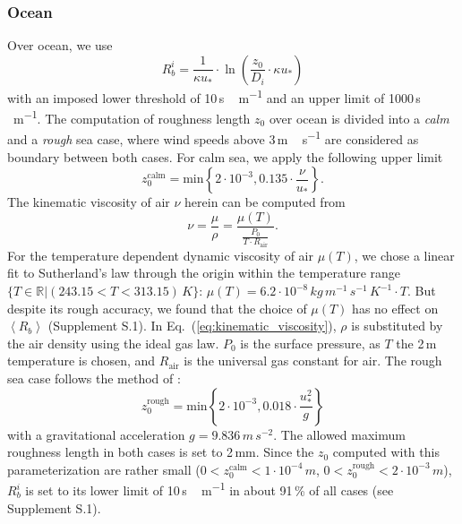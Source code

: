 \documentclass[gmd, manuscript]{copernicus}
\begin{document}
\subsubsection*{Ocean}
Over ocean, we use \citep[Eq.~(54),][]{ACP:Simpson2012}
\begin{equation}
  R_b^i = \frac{1}{\kappa u_*}\cdot\ln\left({\frac{z_0}{D_i}\cdot \kappa u_*}\right)
\end{equation}
with an imposed lower threshold of 10\,\unit{s\,m^{-1}} and an upper limit of 1000\,\unit{s\,m^{-1}}. The computation of roughness length $z_0$ over ocean is divided into a \emph{calm} and a \emph{rough} sea case, where wind speeds above 3\,\unit{m\,s^{-1}} are considered as boundary between both cases. For calm sea, we apply the following upper limit \citep[][with a slightly higher coefficient of $0.135$]{Hinze1975,Garratt1992}
\begin{equation}
  z_0^\text{calm} = \text{min}\left\{2\cdot10^{-3}, 0.135 \cdot \frac{\nu}{u_*}\right\}.
\end{equation}
The kinematic viscosity of air $\nu$ herein can be computed from 
\begin{equation}
  \nu = \frac{\mu}{\rho} = \frac{\mu(T)}{\frac{P_0}{T\cdot R_\text{air}}}.
  \label{eq:kinematic_viscosity}
\end{equation}
For the temperature dependent dynamic viscosity of air $\mu(T)$, we chose a linear fit to Sutherland's law through the origin within the temperature range $\{T \in \mathbb{R} | (243.15 < T < 313.15)\,\unit{K}\}$: $\mu(T) = 6.2\cdot 10^{-8}\,\unit{kg\,m^{-1}\,s^{-1}\,K^{-1}} \cdot T$. But despite its rough accuracy, we found that the choice of $\mu(T)$ has no effect on $\left<R_b\right>$ (Supplement S.1). In Eq.~(\ref{eq:kinematic_viscosity}), $\rho$ is substituted by the air density using the ideal gas law. $P_0$ is the surface pressure, as $T$ the 2\,\unit{m} temperature is chosen, and $R_\text{air}$ is the universal gas constant for air.
The rough sea case follows the method of \citet{QJRMS:Charnock1955,JPO:Wu1980}:
\begin{equation}
  z_0^\text{rough} = \text{min}\left\{2\cdot10^{-3}, 0.018 \cdot \frac{u^2_*}{g}\right\}
\end{equation}
with a gravitational acceleration $g = 9.836\,\unit{m\,s^{-2}}$. The allowed maximum roughness length in both cases is set to 2\,\unit{mm}. Since the $z_0$ computed with this parameterization are rather small ($0 < z_0^\text{calm} < 1\cdot 10^{-4}\,\unit{m}$, $0 < z_0^\text{rough} < 2 \cdot 10^{-3}\,\unit{m}$), $R^i_b$ is set to its lower limit of 10\,\unit{s\,m^{-1}} in about 91\,\unit{\%} of all cases (see Supplement S.1). 
\end{document}
